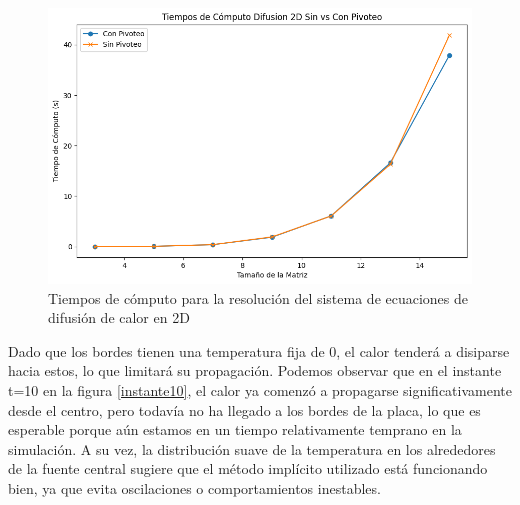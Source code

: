 \begin{figure}[H]
\centerline{\includegraphics[scale=0.45]{./img/Dif2D_tiempos.png}}
\caption{ Tiempos de cómputo para la resolución del sistema de ecuaciones de difusión de calor en 2D}
\label{tiempos_dif2D}
\end{figure}



Dado que los bordes tienen una temperatura fija de 0, el calor tenderá a disiparse hacia estos, lo que limitará su propagación.
Podemos observar que en el instante t=10 en la figura \ref{instante10}, el calor ya comenzó a propagarse significativamente desde el centro, pero todavía no ha llegado a los bordes de la placa, lo que es esperable porque aún estamos en un tiempo relativamente temprano en la simulación. A su vez, la distribución suave de la temperatura en los alrededores de la fuente central sugiere que el método implícito utilizado está funcionando bien, ya que evita oscilaciones o comportamientos inestables.



